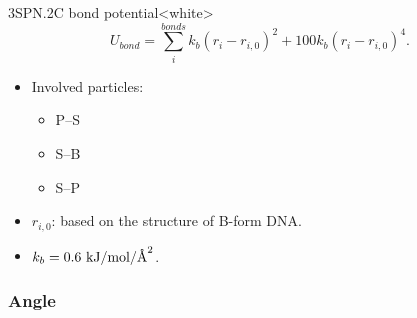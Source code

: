 \begin{smallpage}{3SPN.2C bond potential}<white>
  \begin{equation}
    \label{eq:dna_3spn2c_local_bond}
    U_{bond} = \sum_{i}^{bonds} k_b (r_i - r_{i,0})^2 + 100 k_b (r_i - r_{i,0})^4.
  \end{equation}
  \tcblower
  \begin{itemize}
  \item Involved particles:
    \begin{itemize}
    \item P--S
    \item S--B
    \item S--P
    \end{itemize}
  \item $r_{i, 0}$: based on the structure of B-form DNA.
  \item $k_b = 0.6\ \mathrm{kJ/mol/\angstrom^2}$.
  \end{itemize}
\end{smallpage}



\subsubsection{Angle}
\label{sec:dna_3spn2c_potential_angle}

